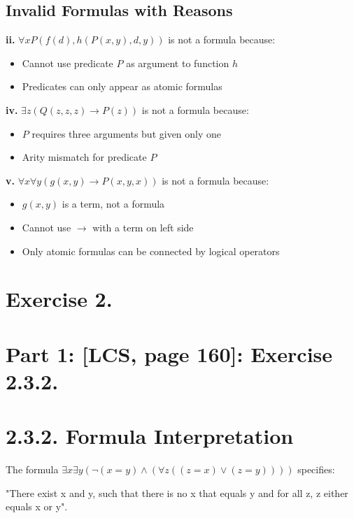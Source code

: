 \documentclass{article}
\begin{document}
\subsection*{Invalid Formulas with Reasons}

\textbf{ii.} $\forall x P(f(d), h(P(x, y), d, y))$ is not a formula because:
\begin{itemize}
    \item Cannot use predicate $P$ as argument to function $h$
    \item Predicates can only appear as atomic formulas
\end{itemize}

\textbf{iv.} $\exists z (Q(z, z, z) \rightarrow P(z))$ is not a formula because:
\begin{itemize}
    \item $P$ requires three arguments but given only one
    \item Arity mismatch for predicate $P$
\end{itemize}

\textbf{v.} $\forall x \forall y (g(x, y) \rightarrow P(x, y, x))$ is not a formula because:
\begin{itemize}
    \item $g(x, y)$ is a term, not a formula
    \item Cannot use $\rightarrow$ with a term on left side
    \item Only atomic formulas can be connected by logical operators
\end{itemize}

\newpage
\section*{Exercise 2.}


\section*{Part 1: [LCS, page 160]: Exercise 2.3.2. }



\section*{2.3.2. Formula Interpretation}

The formula $\exists x \exists y (\neg(x = y) \land (\forall z ((z = x) \lor (z = y))))$ specifies:

\vspace{1em}
"There exist x and y, such that there is no x that equals y and for all z, z either equals x or y".
\end{document}

